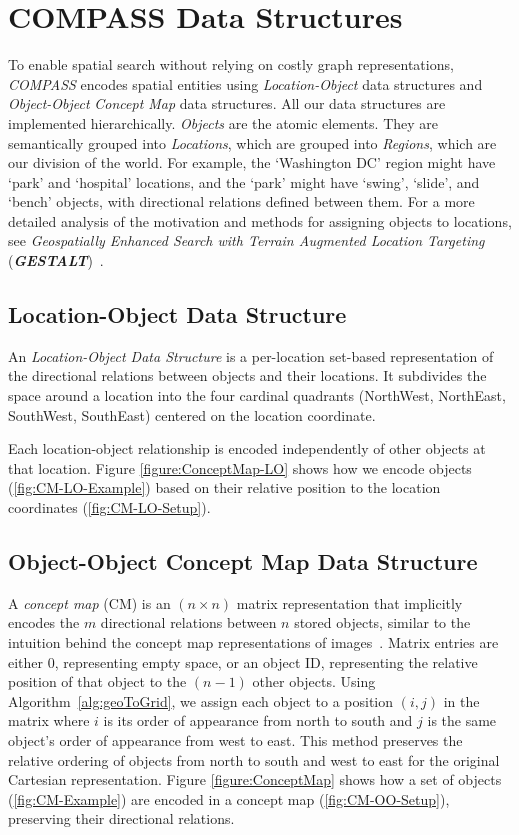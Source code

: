 \section{COMPASS Data Structures}
\label{section:data_structures}
To enable spatial search without relying on costly graph representations, \emph{COMPASS} encodes spatial entities using \textit{Location-Object} data structures and \textit{Object-Object} \textit{Concept Map} data structures. 
All our data structures are implemented hierarchically. \textit{Objects} are the atomic elements. They are semantically grouped into \textit{Locations}, which are grouped into \textit{Regions}, which are our division of the world. For example, the `Washington DC' region might have `park' and `hospital' locations, and the `park' might have `swing', `slide', and `bench' objects, with directional relations defined between them. 
For a more detailed analysis of the motivation and methods for assigning objects to locations, see \textit{Geospatially Enhanced Search with Terrain Augmented Location Targeting} (\textbf{\textit{GESTALT}})~\cite{Osul2023}.

\subsection{Location-Object Data Structure}
An \textit{Location-Object Data Structure} is a per-location set-based representation of the directional relations between objects and their locations.
It subdivides the space around a location into the four cardinal quadrants (NorthWest, NorthEast, SouthWest, SouthEast) centered on the location coordinate.

Each location-object relationship is encoded independently of other objects at that location.
Figure \ref{figure:ConceptMap-LO} shows how we encode objects (\ref{fig:CM-LO-Example}) based on their relative position to the location coordinates (\ref{fig:CM-LO-Setup}).


\subsection{Object-Object Concept Map Data Structure}

A \textit{concept map} (CM) is an $(n\times n)$ matrix representation that implicitly encodes the $m$ directional relations between $n$ stored objects, similar to the intuition behind the concept map representations of images~\cite{Xu2010}.
Matrix entries are either $0$, representing empty space, or an object ID, representing the relative position of that object to the $(n-1)$ other objects.
Using Algorithm~\ref{alg:geoToGrid}, we assign each object to a position $(i,j)$ in the matrix where $i$ is its order of appearance from north to south and $j$ is the same object's order of appearance from west to east.
This method preserves the relative ordering of objects from north to south and west to east for the original Cartesian representation.
Figure \ref{figure:ConceptMap} shows how a set of objects (\ref{fig:CM-Example}) are encoded in a concept map (\ref{fig:CM-OO-Setup}), preserving their directional relations. 


